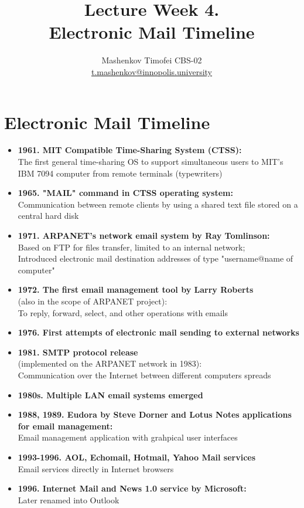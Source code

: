 \documentclass{article}
\title{Lecture Week 4.\\ Electronic Mail Timeline}
\author{Mashenkov Timofei CBS-02 \\ \href{mailto:t.mashenkov@innopolis.university}{t.mashenkov@innopolis.university}}
\begin{document}
\maketitle{}

\section*{Electronic Mail Timeline}

\begin{itemize}
	\item \textbf{1961. MIT Compatible Time-Sharing System (CTSS):} \\
	      The first general time-sharing OS to support simultaneous users to MIT's IBM 7094 computer from remote terminals (typewriters)
	\item \textbf{1965. "MAIL" command in CTSS operating system:} \\
	      Communication between remote clients by using a shared text file stored on a central hard disk
	\item \textbf{1971. ARPANET's network email system by Ray Tomlinson:} \\
	      Based on FTP for files transfer, limited to an internal network; \\
	      Introduced electronic mail destination addresses of type "username@name of computer"
	\item \textbf{1972. The first email management tool by Larry Roberts}\\
	      (also in the scope of ARPANET project): \\
	      To reply, forward, select, and other operations with emails
	\item \textbf{1976. First attempts of electronic mail sending to external networks}
	\item \textbf{1981. SMTP protocol release} \\
	      (implemented on the ARPANET network in 1983): \\
	      Communication over the Internet between different computers spreads
	\item \textbf{1980s. Multiple LAN email systems emerged}
	\item \textbf{1988, 1989. Eudora by Steve Dorner and Lotus Notes applications for email management:} \\
	      Email management application with grahpical user interfaces
	\item \textbf{1993-1996. AOL, Echomail, Hotmail, Yahoo Mail services} \\
	      Email services directly in Internet browsers
	\item \textbf{1996. Internet Mail and News 1.0 service by Microsoft:} \\
	      Later renamed into Outlook
\end{itemize}
\end{document}

